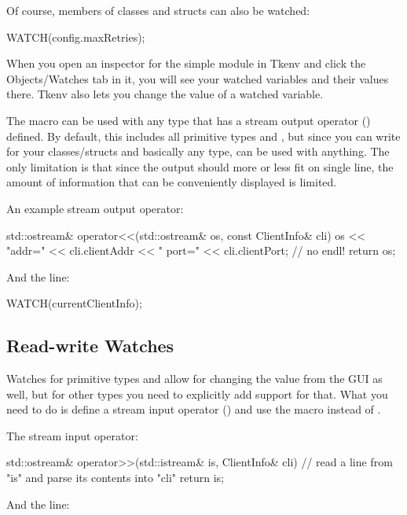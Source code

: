 Of course, members of classes and structs can also be watched:

\begin{cpp}
WATCH(config.maxRetries);
\end{cpp}

When you open an inspector for the simple module in Tkenv and click
the Objects/Watches tab in it, you will see your watched variables
and their values there. Tkenv also lets you change the value of a
watched variable.

The  macro can be used with any type that has a
stream output operator () defined. By default,
this includes all primitive types and , but since
you can write  for your classes/structs and basically
any type,  can be used with anything. The only limitation
is that since the output should more or less fit on single line, the
amount of information that can be conveniently displayed is limited.

An example stream output operator:

\begin{cpp}
std::ostream& operator<<(std::ostream& os, const ClientInfo& cli)
{
    os << "addr=" << cli.clientAddr << "  port=" << cli.clientPort; // no endl!
    return os;
}
\end{cpp}

And the  line:

\begin{cpp}
WATCH(currentClientInfo);
\end{cpp}


\subsection{Read-write Watches}

Watches for primitive types and  allow for changing
the value from the GUI as well, but for other types you need to explicitly
add support for that. What you need to do is define a stream input
operator () and use the  macro instead of
.

The stream input operator:

\begin{cpp}
std::ostream& operator>>(std::istream& is, ClientInfo& cli)
{
    // read a line from "is" and parse its contents into "cli"
    return is;
}
\end{cpp}

And the  line:

